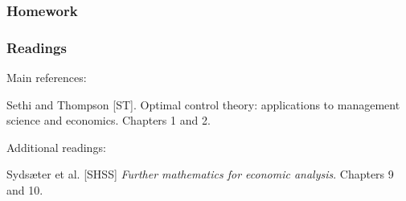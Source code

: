 \documentclass[10pt]{beamer}
\theoremstyle{definition}
\begin{document}
\begin{frame}[fragile]
\frametitle{Homework}

\end{frame}

\begin{frame}[fragile]
\frametitle{Readings}
Main references:

Sethi and Thompson [ST]. Optimal control theory: applications to management science and economics. Chapters 1 and 2.\bigskip

Additional readings:

Syds\ae{}ter et al. [SHSS] \emph{Further mathematics for economic analysis}. Chapters 9 and 10.
\end{frame}
\end{document}
